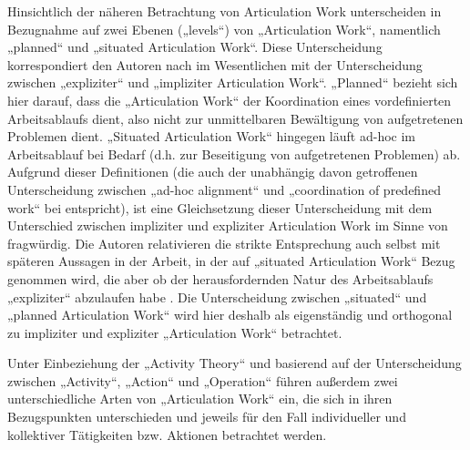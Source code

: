 Hinsichtlich der näheren Betrachtung von Articulation Work unterscheiden \citet{Fjuk97} in Bezugnahme auf \citet{Strauss93} zwei Ebenen („levels“) von „Articulation Work“, namentlich „planned“ und „situated Articulation Work“. Diese Unterscheidung korrespondiert den Autoren nach im Wesentlichen mit der Unterscheidung zwischen „expliziter“ und „impliziter Articulation Work“. „Planned“ bezieht sich hier darauf, dass die „Articulation Work“ der Koordination eines vordefinierten Arbeitsablaufs dient, also nicht zur unmittelbaren Bewältigung von aufgetretenen Problemen dient. „Situated Articulation Work“ hingegen läuft ad-hoc im Arbeitsablauf bei Bedarf (d.h. zur Beseitigung von aufgetretenen Problemen) ab. Aufgrund dieser Definitionen (die auch der unabhängig davon getroffenen Unterscheidung zwischen „ad-hoc alignment“ und „coordination of predefined work“ bei \citet{Schmidt00} entspricht), ist eine Gleichsetzung dieser Unterscheidung mit dem Unterschied zwischen impliziter und expliziter Articulation Work im Sinne von \citet{Strauss93} fragwürdig. Die Autoren relativieren die strikte Entsprechung auch selbst mit späteren Aussagen in der Arbeit, in der auf „situated Articulation Work“ Bezug genommen wird, die aber ob der herausfordernden Natur des Arbeitsablaufs „expliziter“ abzulaufen habe \citep[][S. 15]{Fjuk97}. Die Unterscheidung zwischen „situated“ und „planned Articulation Work“ wird hier deshalb als eigenständig und orthogonal zu impliziter und expliziter „Articulation Work“ betrachtet.

Unter Einbeziehung der „Activity Theory“ und basierend auf der Unterscheidung zwischen „Activity“, „Action“ und „Operation“ führen \citet{Fjuk97} außerdem zwei unterschiedliche Arten von „Articulation Work“ ein, die sich in ihren Bezugspunkten unterschieden und jeweils für den Fall individueller und kollektiver Tätigkeiten bzw. Aktionen betrachtet werden.  

